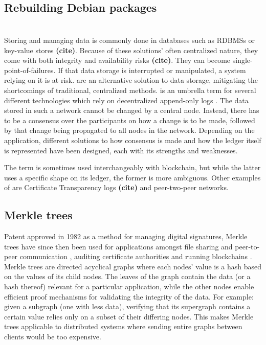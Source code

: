 \documentclass[english, biblatex, digitaloutput]{kththesis}
\begin{document}
\subsection{Rebuilding Debian packages}



\section{}

Storing and managing data is commonly done in databases such as \glspl{RDBMS} or key-value stores \textbf{(cite)}. Because of these solutions' often centralized nature, they come with both integrity and availability risks \textbf{(cite)}. They can become single-point-of-failures. If that data storage is interrupted or manipulated, a system relying on it is at risk.  are an alternative solution to data storage, mitigating the shortcomings of traditional, centralized methods.  is an umbrella term for several different technologies which rely on decentralized append-only logs \cite{kannengieser_trade-offs_2021} . The data stored in such a network cannot be changed by a central node. Instead, there has to be a consensus over the participants on how a change is to be made, followed by that change being propagated to all nodes in the network. Depending on the application, different solutions to how consensus is made and how the ledger itself is represented have been designed, each with its strengths and weaknesses.

The term  is sometimes used interchangeably with blockchain, but while the latter uses a specific shape on its ledger, the former is more ambiguous. Other examples of  are Certificate Transparency logs \textbf{(cite)} and peer-two-peer networks.

\subsection{Merkle trees}

Patent approved in 1982 \cite{merkle_method_1982} as a method for managing digital signatures, Merkle trees have since then been used for applications amongst file sharing and peer-to-peer communication \cite{daniel_ipfs_2022}, auditing certificate authorities \cite{laurie_certificate_2013} and running blockchains \cite{zahed_benisi_blockchain-based_2020}. Merkle trees are directed acyclical graphs where each nodes' value is a hash based on the values of its child nodes. The leaves of the graph contain the data (or a hash thereof) relevant for a particular application, while the other nodes enable efficient proof mechanisms for validating the integrity of the data. For example: given a subgraph (\ie one with less data), verifying that its supergraph contains a certain value relies only on a subset of their differing nodes. This makes Merkle trees applicable to distributed systems where sending entire graphs between clients would be too expensive.
\end{document}
